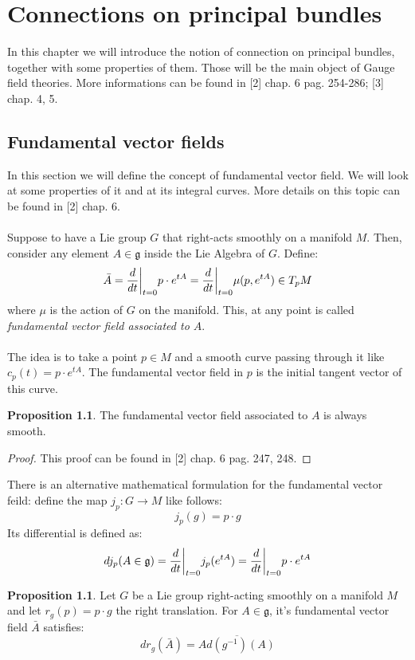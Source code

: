 \documentclass[12pt,a4paper]{report}
\theoremstyle{definition}
\theoremstyle{Theorem}
\newtheorem{Prop}[Def]{Proposition}
\theoremstyle{definition}
\theoremstyle{definition}
\begin{document}
	\chapter{Connections on principal bundles}
	In this chapter we will introduce the notion of connection on principal bundles, together with some properties of them. Those will be the main object of Gauge field theories. More informations can be found in [2] chap. 6 pag. 254-286; [3] chap. 4, 5.
		\section{Fundamental vector fields}
		In this section we will define the concept of fundamental vector field. We will look at some properties of it and at its integral curves. More details on this topic can be found in [2] chap. 6.\\
		\\
		Suppose to have a Lie group $G$ that right-acts smoothly on a manifold $M$. Then, consider any element $A\in\mathfrak{g}$ inside the Lie Algebra of $G$. Define:
		$$\bar{A}={d\over dt}\bigg|_{t=0}p\cdot e^{tA}={d\over dt}\bigg|_{t=0}\mu(p, e^{tA})\in T_pM$$
		where $\mu$ is the action of $G$ on the manifold.
		This, at any point is called \textit{fundamental vector field associated to $A$}.\\
		\\
		The idea is to take a point $p\in M$ and a smooth curve passing through it like $c_p(t)=p\cdot e^{tA}$. The fundamental vector field in $p$ is the initial tangent vector of this curve.
		\begin{Prop}\label{Prop_5.1.2}
			The fundamental vector field associated to $A$ is always smooth.
		\end{Prop}
		\begin{proof}
			This proof can be found in [2] chap. 6 pag. 247, 248.
		\end{proof}
		There is an alternative mathematical formulation for the fundamental vector feild: define the map $j_p:G\rightarrow M$ like follows:
		$$j_p(g)=p\cdot g$$
		Its differential is defined as:
		$$dj_p(A\in\mathfrak{g})={d\over dt}\bigg|_{t=0}j_p(e^{tA})={d\over dt}\bigg|_{t=0}p\cdot e^{tA}$$
		\begin{Prop}\label{Prop_5.1.1}
			Let $G$ be a Lie group right-acting smoothly on a manifold $M$ and let $r_g(p)=p\cdot g$ the right translation. For $A\in\mathfrak{g}$, it's fundamental vector field $\bar{A}$ satisfies:
			$$dr_g(\bar{A})=\overline{Ad(g^{-1})(A)}$$
		\end{Prop}
\end{document}
